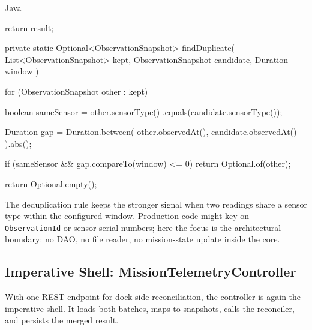 \begin{ridercode}{Java}
{{        return result;
    }

    private static Optional<ObservationSnapshot> findDuplicate(
        List<ObservationSnapshot> kept,
        ObservationSnapshot candidate,
        Duration window
    )
    {
        for (ObservationSnapshot other : kept)
        {
            boolean sameSensor = other.sensorType()
                .equals(candidate.sensorType());

            Duration gap = Duration.between(
                other.observedAt(),
                candidate.observedAt()
            ).abs();

            if (sameSensor && gap.compareTo(window) <= 0)
            {
                return Optional.of(other);
            }
        }

        return Optional.empty();
    }
}
\end{ridercode}
\label{lst:fcis-reconciliation-core}

The deduplication rule keeps the stronger signal when two readings share a sensor type within the configured window. Production code might key on \texttt{ObservationId} or sensor serial numbers; here the focus is the architectural boundary: no DAO, no file reader, no mission-state update inside the core.

\subsection{Imperative Shell: MissionTelemetryController}
\label{sec:fcis_reconciliation_shell}

With one REST endpoint for dock-side reconciliation, the controller is again the imperative shell. It loads both batches, maps to snapshots, calls the reconciler, and persists the merged result.

